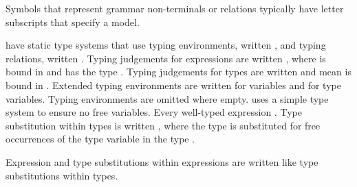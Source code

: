 Symbols that represent grammar non-terminals or relations typically have letter subscripts that specify a model.

\Thehaskellml have static type systems that use typing environments, written \env, and typing relations, written \jud. Typing judgements for expressions are written \jude{\env}{\jud}{\varexp}{\varty}, where \varexp is bound in \env and has the type \varty. Typing judgements for types are written \judt{\env}{\jud}{\varty} and mean \varty is bound in \env. Extended typing environments are written \envexte{\env}{\varvar}{\varty} for variables and \envextt{\env}{\tyvar} for type variables. Typing environments are omitted where empty. \Thescheme uses a simple type system to ensure no free variables. Every well-typed \scheme expression \hastype{\tytst}. Type substitution within types is written , where the type  is substituted for free occurrences of the type variable  in the type .

Expression and type substitutions within expressions are written like type substitutions within types.

\clearpage



\clearpage



\clearpage



\clearpage



\clearpage



\clearpage



\clearpage



\clearpage



\clearpage



\clearpage



\clearpage

